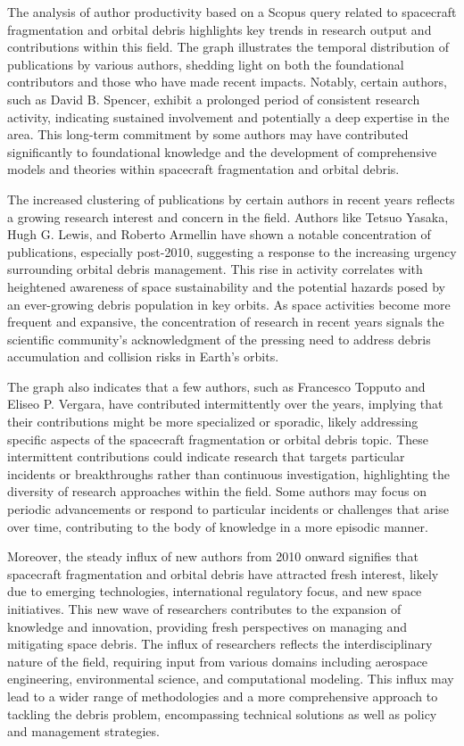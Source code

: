 \documentclass[journal ]{new-aiaa}
\begin{document}
The analysis of author productivity based on a Scopus query related to spacecraft fragmentation and orbital debris highlights key trends in research output and contributions within this field. The graph illustrates the temporal distribution of publications by various authors, shedding light on both the foundational contributors and those who have made recent impacts. Notably, certain authors, such as David B. Spencer, exhibit a prolonged period of consistent research activity, indicating sustained involvement and potentially a deep expertise in the area. This long-term commitment by some authors may have contributed significantly to foundational knowledge and the development of comprehensive models and theories within spacecraft fragmentation and orbital debris.

The increased clustering of publications by certain authors in recent years reflects a growing research interest and concern in the field. Authors like Tetsuo Yasaka, Hugh G. Lewis, and Roberto Armellin have shown a notable concentration of publications, especially post-2010, suggesting a response to the increasing urgency surrounding orbital debris management. This rise in activity correlates with heightened awareness of space sustainability and the potential hazards posed by an ever-growing debris population in key orbits. As space activities become more frequent and expansive, the concentration of research in recent years signals the scientific community's acknowledgment of the pressing need to address debris accumulation and collision risks in Earth’s orbits.

The graph also indicates that a few authors, such as Francesco Topputo and Eliseo P. Vergara, have contributed intermittently over the years, implying that their contributions might be more specialized or sporadic, likely addressing specific aspects of the spacecraft fragmentation or orbital debris topic. These intermittent contributions could indicate research that targets particular incidents or breakthroughs rather than continuous investigation, highlighting the diversity of research approaches within the field. Some authors may focus on periodic advancements or respond to particular incidents or challenges that arise over time, contributing to the body of knowledge in a more episodic manner.

Moreover, the steady influx of new authors from 2010 onward signifies that spacecraft fragmentation and orbital debris have attracted fresh interest, likely due to emerging technologies, international regulatory focus, and new space initiatives. This new wave of researchers contributes to the expansion of knowledge and innovation, providing fresh perspectives on managing and mitigating space debris. The influx of researchers reflects the interdisciplinary nature of the field, requiring input from various domains including aerospace engineering, environmental science, and computational modeling. This influx may lead to a wider range of methodologies and a more comprehensive approach to tackling the debris problem, encompassing technical solutions as well as policy and management strategies.
\end{document}
